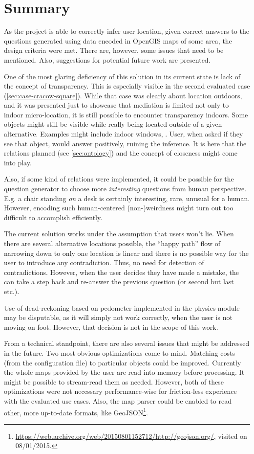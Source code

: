 \chapter{Summary}
\label{cha:summary}

As the project is able to correctly infer user location, given correct answers to the questions generated using data encoded in OpenGIS maps of some area, the design criteria were met. There are, however, some issues that need to be mentioned. Also, suggestions for potential future work are presented.

One of the most glaring deficiency of this solution in its current state is lack of the concept of transparency. This is especially visible in the second evaluated case (\cref{sec:case-cracow-square}). While that case was clearly about location outdoors, and it was presented just to showcase that mediation is limited not only to indoor micro-location, it is still possible to encounter transparency indoors. Some objects might still be visible while really being located outside of a given alternative. Examples might include indoor windows, . User, when asked if they see that object, would answer positively, ruining the inference. It is here that the relations planned (see \cref{sec:ontology}) and the concept of closeness might come into play.

Also, if some kind of relations were implemented, it could be possible for the question generator to choose more \emph{interesting} questions from human perspective. E.g. a chair standing \emph{on} a desk is certainly interesting, rare, unusual for a human. However, encoding such human-centered (non-)weirdness might turn out too difficult to accomplish efficiently.

The current solution works under the assumption that users won't lie. When there are several alternative locations possible, the ``happy path'' flow of narrowing down to only one location is linear and there is no possible way for the user to introduce any contradiction. Thus, no need for detection of contradictions. However, when the user decides they have made a mistake, the can take a step back and re-answer the previous question (or second but last etc.).

Use of dead-reckoning based on pedometer implemented in the physics module may be disputable, as it will simply not work correctly, when the user is not moving on foot. However, that decision is not in the scope of this work.

From a technical standpoint, there are also several issues that might be addressed in the future. Two most obvious optimizations come to mind. Matching costs (from the configuration file) to particular objects could be improved. Currently the whole maps provided by the user are read into memory before processing. It might be possible to stream-read them as needed. However, both of these optimizations were not necessary performance-wise for friction-less experience with the evaluated use cases. Also, the map parser could be enabled to read other, more up-to-date formats, like GeoJSON\footnote{\url{https://web.archive.org/web/20150801152712/http://geojson.org/}, visited on 08/01/2015.}.

